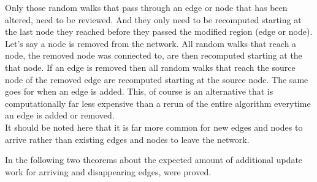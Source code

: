 \documentclass[twocolumn]{article}
\theoremstyle{definition}
\theoremstyle{theorem}
\begin{document}
\begin{itemize}
Only those random walks that pass through an edge or node that has been altered, need to be reviewed. And they only need to be recomputed starting at the last node they reached before they passed the modified region (edge or node). Let's say a node is removed from the network. All random walks that reach a node, the removed node was connected to, are then recomputed starting at the that node. If an edge is removed then all random walks that reach the source node of the removed edge are recomputed starting at the source node. The same goes for when an edge is added. This, of course is an alternative that is computationally far less expensive than a rerun of the entire algorithm everytime an edge is added or removed. \vspace{1em}\\
It should be noted here that it is far more common for new edges and nodes to arrive rather than existing edges and nodes to leave the network.\vspace{1em}\\
\end{itemize}
In \cite{Fast incremental and personalized pagerank} the following two theorems about the expected amount of additional update work for arriving and disappearing edges, were proved.
\end{document}
